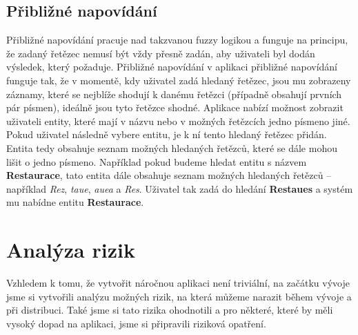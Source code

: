 \subsection{Přibližné napovídání}
\par Přibližné napovídání pracuje nad takzvanou fuzzy logikou a funguje na principu, že zadaný řetězec nemusí být vždy přesně zadán, aby uživateli byl dodán výsledek, který požaduje. Přibližné napovídání v aplikaci přibližné napovídání funguje tak, že v momentě, kdy uživatel zadá hledaný řetězec, jsou mu zobrazeny záznamy, které se nejblíže shodují k danému řetězci (případně obsahují prvních pár písmen), ideálně jsou tyto řetězce shodné. Aplikace nabízí možnost zobrazit uživateli entity, které mají v názvu nebo v možných řetězcích jedno písmeno jiné. Pokud uživatel následně vybere entitu, je k ní tento hledaný řetězec přidán. Entita tedy obsahuje seznam možných hledaných řetězců, které se dále mohou lišit o jedno písmeno. Například pokud budeme hledat entitu s názvem \textbf{Restaurace}, tato entita dále obsahuje seznam možných hledaných řetězců -- například \textit{Rez}, \textit{taue}, \textit{auea} a \textit{Res}. Uživatel tak zadá do hledání \textbf{Restaues} a systém mu nabídne entitu \textbf{Restaurace}.

\section{Analýza rizik}
\par Vzhledem k tomu, že vytvořit náročnou aplikaci není triviální, na začátku vývoje jsme si vytvořili analýzu možných rizik, na která můžeme narazit během vývoje a při distribuci. Také jsme si tato rizika ohodnotili a pro některé, které by měli vysoký dopad na aplikaci, jsme si připravili riziková opatření.

